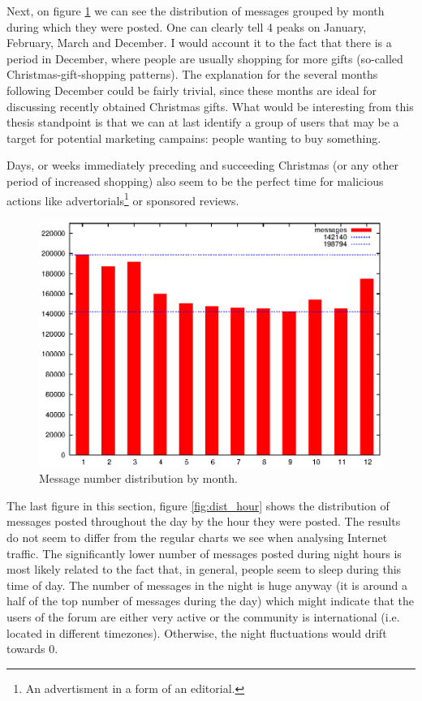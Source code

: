     Next, on figure \ref{fig:dist_month} we can see the distribution of messages grouped by month during which they were posted. One can clearly tell 4 peaks on January, February, March and December. I would account it to the fact that there is a  period in December, where people are usually shopping for more gifts (so-called Christmas-gift-shopping patterns)\cite{FischerArnold1990,ArnoldReynolds2003}. The explanation for the several months following December could be fairly trivial, since these months are ideal for discussing recently obtained Christmas gifts. What would be interesting from this thesis standpoint is that we can at last identify a group of users that may be a target for potential marketing campains: people wanting to buy something.
    
    Days, or weeks immediately preceding and succeeding Christmas (or any other period of increased shopping) also seem to be the perfect time for malicious actions like advertorials\footnote{An advertisment in a form of an editorial.} or sponsored reviews.
    \begin{figure}[H]
      \includegraphics[width=\textwidth]{chapters/03_implementation/monthly}
      \caption{Message number distribution by month.}
      \label{fig:dist_month}
    \end{figure}
    
    The last figure in this section, figure \ref{fig:dist_hour} shows the distribution of messages posted throughout the day by the hour they were posted. The results do not seem to differ from the regular charts we see when analysing Internet traffic\cite{GebertPries2012}. The significantly lower number of messages posted during night hours is most likely related to the fact that, in general, people seem to sleep during this time of day\cite{Carskadon2002}. The number of messages in the night is huge anyway (it is around a half of the top number of messages during the day) which might indicate that the users of the forum are either very active or the community is international (i.e. located in different timezones). Otherwise, the night fluctuations would drift towards 0.
    
